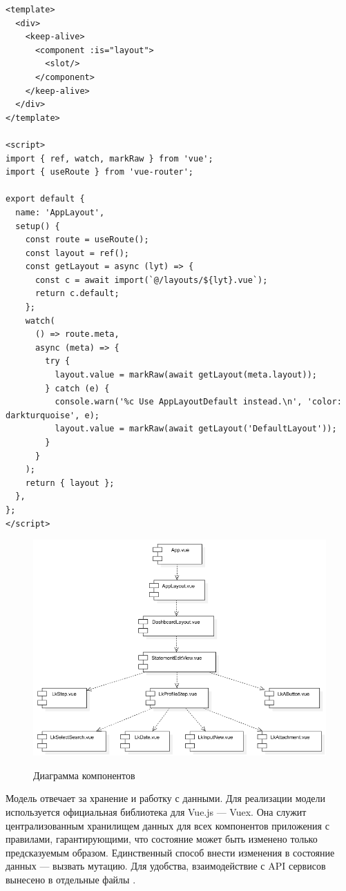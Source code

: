 \begin{lstlisting}[caption={Реализация компонента AppLayout}, label={ls:applayout}]
<template>
  <div>
    <keep-alive>
      <component :is="layout">
        <slot/>
      </component>
    </keep-alive>
  </div>
</template>

<script>
import { ref, watch, markRaw } from 'vue';
import { useRoute } from 'vue-router';

export default {
  name: 'AppLayout',
  setup() {
    const route = useRoute();
    const layout = ref();
    const getLayout = async (lyt) => {
      const c = await import(`@/layouts/${lyt}.vue`);
      return c.default;
    };
    watch(
      () => route.meta,
      async (meta) => {
        try {
          layout.value = markRaw(await getLayout(meta.layout));
        } catch (e) {
          console.warn('%c Use AppLayoutDefault instead.\n', 'color: darkturquoise', e);
          layout.value = markRaw(await getLayout('DefaultLayout'));
        }
      }
    );
    return { layout };
  },
};
</script>
\end{lstlisting}

\begin{figure}[H]
\begin{center}
\includegraphics[width=0.9\hsize]{fig/diagram-components.png}\\[2mm]
\caption{Диаграмма компонентов}\label{fig:diagramcomponent}
\end{center}
\end{figure}

Модель отвечает за хранение и работку с данными. Для реализации модели используется официальная библиотека для Vue.js — Vuex. Она служит централизованным хранилищем данных для всех компонентов приложения с правилами, гарантирующими, что состояние может быть изменено только предсказуемым образом. Единственный способ внести изменения в состояние данных — вызвать мутацию. Для удобства, взаимодействие с API сервисов вынесено в отдельные файлы \cite{vuex}.

